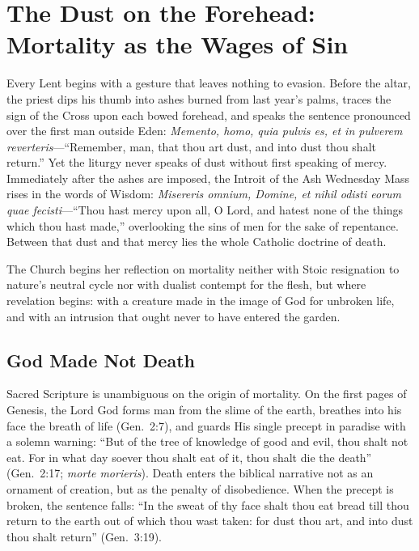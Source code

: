 \section{The Dust on the Forehead: Mortality as the Wages of Sin}

Every Lent begins with a gesture that leaves nothing to evasion. Before the altar, the priest dips his thumb into ashes burned from last year's palms, traces the sign of the Cross upon each bowed forehead, and speaks the sentence pronounced over the first man outside Eden: \emph{Memento, homo, quia pulvis es, et in pulverem reverteris}---``Remember, man, that thou art dust, and into dust thou shalt return.'' Yet the liturgy never speaks of dust without first speaking of mercy. Immediately after the ashes are imposed, the Introit of the Ash Wednesday Mass rises in the words of Wisdom: \emph{Misereris omnium, Domine, et nihil odisti eorum quae fecisti}---``Thou hast mercy upon all, O Lord, and hatest none of the things which thou hast made,'' overlooking the sins of men for the sake of repentance. Between that dust and that mercy lies the whole Catholic doctrine of death.

The Church begins her reflection on mortality neither with Stoic resignation to nature's neutral cycle nor with dualist contempt for the flesh, but where revelation begins: with a creature made in the image of God for unbroken life, and with an intrusion that ought never to have entered the garden.

\subsection{God Made Not Death}

Sacred Scripture is unambiguous on the origin of mortality. On the first pages of Genesis, the Lord God forms man from the slime of the earth, breathes into his face the breath of life (Gen.\ 2:7), and guards His single precept in paradise with a solemn warning: ``But of the tree of knowledge of good and evil, thou shalt not eat. For in what day soever thou shalt eat of it, thou shalt die the death'' (Gen.\ 2:17; \emph{morte morieris}). Death enters the biblical narrative not as an ornament of creation, but as the penalty of disobedience. When the precept is broken, the sentence falls: ``In the sweat of thy face shalt thou eat bread till thou return to the earth out of which thou wast taken: for dust thou art, and into dust thou shalt return'' (Gen.\ 3:19).

